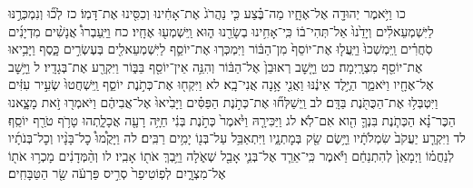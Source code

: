 \documentclass[twoside, openany, parskip=half, 11pt]{book}
\begin{document}
כו וַיֹּ֥אמֶר יְהוּדָ֖ה אֶל־אֶחָ֑יו מַה־בֶּ֗צַע כִּ֤י נַהֲרֹג֙ אֶת־אָחִ֔ינוּ וְכִסִּ֖ינוּ אֶת־דָּמֽוֹ׃ כז לְכ֞וּ וְנִמְכְּרֶ֣נּוּ לַיִּשְׁמְעֵאלִ֗ים וְיָדֵ֙נוּ֙ אַל־תְּהִי־ב֔וֹ כִּֽי־אָחִ֥ינוּ בְשָׂרֵ֖נוּ ה֑וּא וַֽיִּשְׁמְע֖וּ אֶחָֽיו׃ כח וַיַּֽעַבְרוּ֩ אֲנָשִׁ֨ים מִדְיָנִ֜ים סֹֽחֲרִ֗ים וַֽיִּמְשְׁכוּ֙ וַיַּֽעֲל֤וּ אֶת־יוֹסֵף֙ מִן־הַבּ֔וֹר וַיִּמְכְּר֧וּ אֶת־יוֹסֵ֛ף לַיִּשְׁמְעֵאלִ֖ים בְּעֶשְׂרִ֣ים כָּ֑סֶף וַיָּבִ֥יאוּ אֶת־יוֹסֵ֖ף מִצְרָֽיְמָה׃ כט וַיָּ֤שׇׁב רְאוּבֵן֙ אֶל־הַבּ֔וֹר וְהִנֵּ֥ה אֵין־יוֹסֵ֖ף בַּבּ֑וֹר וַיִּקְרַ֖ע אֶת־בְּגָדָֽיו׃ ל וַיָּ֥שׇׁב אֶל־אֶחָ֖יו וַיֹּאמַ֑ר הַיֶּ֣לֶד אֵינֶ֔נּוּ וַאֲנִ֖י אָ֥נָה אֲנִי־בָֽא׃ לא וַיִּקְח֖וּ אֶת־כְּתֹ֣נֶת יוֹסֵ֑ף וַֽיִּשְׁחֲטוּ֙ שְׂעִ֣יר עִזִּ֔ים וַיִּטְבְּל֥וּ אֶת־הַכֻּתֹּ֖נֶת בַּדָּֽם׃ לב וַֽיְשַׁלְּח֞וּ אֶת־כְּתֹ֣נֶת הַפַּסִּ֗ים וַיָּבִ֙יאוּ֙ אֶל־אֲבִיהֶ֔ם וַיֹּאמְר֖וּ זֹ֣את מָצָ֑אנוּ הַכֶּר־נָ֗א הַכְּתֹ֧נֶת בִּנְךָ֛ הִ֖וא אִם־לֹֽא׃ לג וַיַּכִּירָ֤הּ וַיֹּ֙אמֶר֙ כְּתֹ֣נֶת בְּנִ֔י חַיָּ֥ה רָעָ֖ה אֲכָלָ֑תְהוּ טָרֹ֥ף טֹרַ֖ף יוֹסֵֽף׃ לד וַיִּקְרַ֤ע יַעֲקֹב֙ שִׂמְלֹתָ֔יו וַיָּ֥שֶׂם שַׂ֖ק בְּמׇתְנָ֑יו וַיִּתְאַבֵּ֥ל עַל־בְּנ֖וֹ יָמִ֥ים רַבִּֽים׃ לה וַיָּקֻ֩מוּ֩ כׇל־בָּנָ֨יו וְכׇל־בְּנֹתָ֜יו לְנַחֲמ֗וֹ וַיְמָאֵן֙ לְהִתְנַחֵ֔ם וַיֹּ֕אמֶר כִּֽי־אֵרֵ֧ד אֶל־בְּנִ֛י אָבֵ֖ל שְׁאֹ֑לָה וַיֵּ֥בְךְּ אֹת֖וֹ אָבִֽיו׃ לו וְהַ֨מְּדָנִ֔ים מָכְר֥וּ אֹת֖וֹ אֶל־מִצְרָ֑יִם לְפֽוֹטִיפַר֙ סְרִ֣יס פַּרְעֹ֔ה שַׂ֖ר הַטַּבָּחִֽים׃
\end{document}

